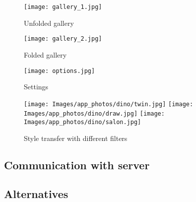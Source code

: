 \documentclass[../Main.tex]{subfiles}
\begin{document}
\begin{figure}[H]
        \texttt{[image: gallery\_1.jpg]}
        \caption{Unfolded gallery}\label{fig:gallery_unfolded}
    \endminipage\hfill
        \texttt{[image: gallery\_2.jpg]}
        \caption{Folded gallery}\label{fig:gallery_folded}
    \endminipage\hfill
        \texttt{[image: options.jpg]}
        \caption{Settings}\label{fig:gallery_options2}
    \endminipage\hfill
\end{figure}

\begin{figure}[H]
        \texttt{[image: Images/app\_photos/dino/twin.jpg]}
    \endminipage\hfill
        \texttt{[image: Images/app\_photos/dino/draw.jpg]}
    \endminipage\hfill
        \texttt{[image: Images/app\_photos/dino/salon.jpg]}
    \endminipage\hfill
    \caption{Style transfer with different filters}\label{fig:gallery_options}
\end{figure}

\subsection{Communication with server}

\subsection{Alternatives}
\end{document}
